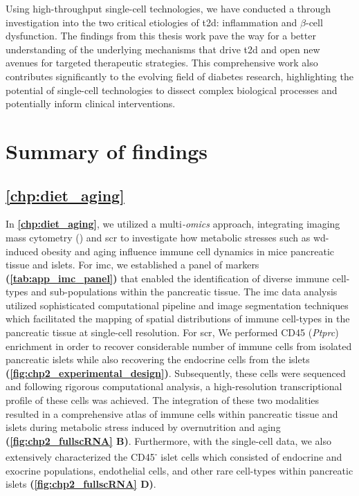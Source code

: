 Using high-throughput single-cell technologies, we have conducted a through investigation into the two critical etiologies of \gls{t2d}: inflammation and $\beta$-cell dysfunction. The findings from this thesis work pave the way for a better understanding of the underlying mechanisms that drive \gls{t2d} and open new avenues for targeted therapeutic strategies. This comprehensive work also contributes significantly to the evolving field of diabetes research, highlighting the potential of single-cell technologies to dissect complex biological processes and potentially inform clinical interventions.

\section{Summary of findings}

\subsection{\autoref{chp:diet_aging}}

\par In \textbf{\autoref{chp:diet_aging}}, we utilized a multi\textit{-omics} approach, integrating imaging mass cytometry () and \acrfull{scr} to investigate how metabolic stresses such as \acrfull{wd}-induced obesity and aging influence immune cell dynamics in mice pancreatic tissue and islets. For \gls{imc}, we established a panel of markers \textbf{(\autoref{tab:app_imc_panel})} that enabled the identification of diverse immune cell-types and sub-populations within the pancreatic tissue. The \gls{imc} data analysis utilized sophisticated computational pipeline and image segmentation techniques which facilitated the mapping of spatial distributions of immune cell-types in the pancreatic tissue at single-cell resolution. For \gls{scr}, We performed CD45 (\textit{Ptprc}) enrichment in order to recover considerable number of immune cells from isolated pancreatic islets while also recovering the endocrine cells from the islets \textbf{(\autoref{fig:chp2_experimental_design})}. Subsequently, these cells were sequenced and following rigorous computational analysis, a high-resolution transcriptional profile of these cells was achieved. The integration of these two modalities resulted in a comprehensive atlas of immune cells within pancreatic tissue and islets during metabolic stress induced by overnutrition and aging \textbf{(\autoref{fig:chp2_fullscRNA} B)}. Furthermore, with the single-cell data, we also extensively characterized the CD45\textsuperscript{-} islet cells which consisted of endocrine and exocrine populations, endothelial cells, and other rare cell-types within pancreatic islets \textbf{(\autoref{fig:chp2_fullscRNA} D)}. 

